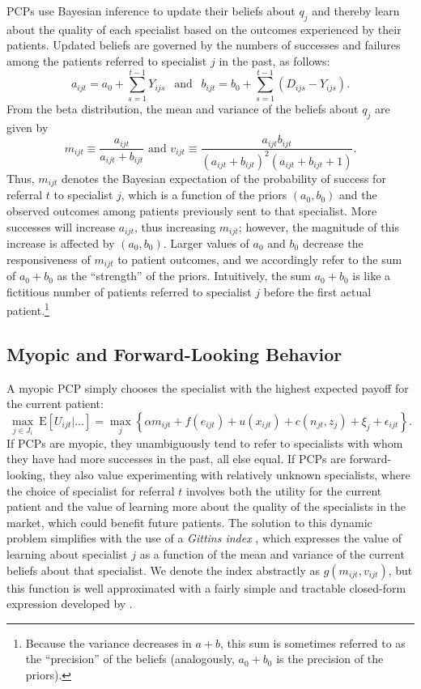 \documentclass[12pt]{article}
\begin{document}
PCPs use Bayesian inference to update their beliefs about $q_j$ and thereby learn about the quality of each specialist based on the outcomes experienced by their patients. Updated beliefs are governed by the numbers of successes and failures among the patients referred to specialist $j$ in the past, as follows:
\begin{equation*}
a_{ijt} = a_0 + \sum_{s=1}^{t-1} Y_{ijs} \ \ \text{ and } \ \ b_{ijt} = b_0 + \sum_{s=1}^{t-1} (D_{ijs} - Y_{ijs}).
\end{equation*}
From the beta distribution, the mean and variance of the beliefs about $q_j$ are given by
\begin{equation}
m_{ijt} \equiv \frac{ a_{ijt} }{ a_{ijt} + b_{ijt} } \text{ and }
v_{ijt} \equiv \frac{ a_{ijt} b_{ijt} }{ (a_{ijt} + b_{ijt})^2 (a_{ijt} + b_{ijt} + 1) } . \label{eqn:mean_var}
\end{equation}
Thus, $m_{ijt}$ denotes the Bayesian expectation of the probability of success for referral $t$ to specialist $j$, which is a function of the priors $(a_0, b_0)$ and the observed outcomes among patients previously sent to that specialist. More successes will increase $a_{ijt}$, thus increasing $m_{ijt}$; however, the magnitude of this increase is affected by $(a_{0},b_{0})$. Larger values of $a_0$ and $b_0$ decrease the responsiveness of $m_{ijt}$ to patient outcomes, and we accordingly refer to the sum of $a_0 + b_0$ as the ``strength'' of the priors. Intuitively, the sum $a_0 + b_0$ is like a fictitious number of patients referred to specialist $j$ before the first actual patient.\footnote{Because the variance decreases in $a + b$, this sum is sometimes referred to as the ``precision'' of the beliefs (analogously, $a_0 + b_0$ is the precision of the priors).}

\subsection{Myopic and Forward-Looking Behavior}
A myopic PCP simply chooses the specialist with the highest expected payoff for the current patient:
\begin{equation}
\max_{j \in J_i} \ \text{E} \left[ U_{ijt} | \dots \right]
= \max_j \left\{ \alpha m_{ijt} + f(e_{ijt}) + u(x_{ijt}) + c(n_{jt}, z_j) + \xi_j + \epsilon_{ijt} \right\} .
\label{eqn:myopic}
\end{equation}
If PCPs are myopic, they unambiguously tend to refer to specialists with whom they have had more successes in the past, all else equal. If PCPs are forward-looking, they also value experimenting with relatively unknown specialists, where the choice of specialist for referral $t$ involves both the utility for the current patient and the value of learning more about the quality of the specialists in the market, which could benefit future patients. The solution to this dynamic problem simplifies with the use of a \emph{Gittins index} \citep{gittins1979, gittins1979bio}, which expresses the value of learning about specialist $j$ as a function of the mean and variance of the current beliefs about that specialist. We denote the index abstractly as $g(m_{ijt}, v_{ijt})$, but this function is well approximated with a fairly simple and tractable closed-form expression developed by \cite{brezzi2002}. 
\end{document}
